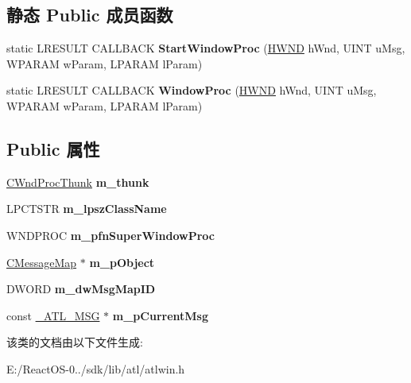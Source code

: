 \subsection*{静态 Public 成员函数}
\begin{DoxyCompactItemize}
\item 
\mbox{\label{class_a_t_l_1_1_c_contained_window_t_a52c4e15b297f166a7b29ccc0e80f5360}} 
static L\+R\+E\+S\+U\+LT C\+A\+L\+L\+B\+A\+CK {\bfseries Start\+Window\+Proc} (\hyperlink{interfacevoid}{H\+W\+ND} h\+Wnd, U\+I\+NT u\+Msg, W\+P\+A\+R\+AM w\+Param, L\+P\+A\+R\+AM l\+Param)
\item 
\mbox{\label{class_a_t_l_1_1_c_contained_window_t_a25894852e0cf8b198a15681870c714b7}} 
static L\+R\+E\+S\+U\+LT C\+A\+L\+L\+B\+A\+CK {\bfseries Window\+Proc} (\hyperlink{interfacevoid}{H\+W\+ND} h\+Wnd, U\+I\+NT u\+Msg, W\+P\+A\+R\+AM w\+Param, L\+P\+A\+R\+AM l\+Param)
\end{DoxyCompactItemize}
\subsection*{Public 属性}
\begin{DoxyCompactItemize}
\item 
\mbox{\label{class_a_t_l_1_1_c_contained_window_t_a5c8b24cc797de31d0cf675352a789fdc}} 
\hyperlink{class_a_t_l_1_1_c_wnd_proc_thunk}{C\+Wnd\+Proc\+Thunk} {\bfseries m\+\_\+thunk}
\item 
\mbox{\label{class_a_t_l_1_1_c_contained_window_t_ad44f8d98569fe3df3f3bdc32dd84b557}} 
L\+P\+C\+T\+S\+TR {\bfseries m\+\_\+lpsz\+Class\+Name}
\item 
\mbox{\label{class_a_t_l_1_1_c_contained_window_t_a4b6047d0a90e7e9c9286f4513878ab3e}} 
W\+N\+D\+P\+R\+OC {\bfseries m\+\_\+pfn\+Super\+Window\+Proc}
\item 
\mbox{\label{class_a_t_l_1_1_c_contained_window_t_a40a68e484a9b9aa588bb3f7067dbebea}} 
\hyperlink{class_a_t_l_1_1_c_message_map}{C\+Message\+Map} $\ast$ {\bfseries m\+\_\+p\+Object}
\item 
\mbox{\label{class_a_t_l_1_1_c_contained_window_t_a75a60db16e81f5c1f31727682a8bd229}} 
D\+W\+O\+RD {\bfseries m\+\_\+dw\+Msg\+Map\+ID}
\item 
\mbox{\label{class_a_t_l_1_1_c_contained_window_t_af39f58992037ced170d2bc6b06daf19e}} 
const \hyperlink{struct_a_t_l_1_1___a_t_l___m_s_g}{\+\_\+\+A\+T\+L\+\_\+\+M\+SG} $\ast$ {\bfseries m\+\_\+p\+Current\+Msg}
\end{DoxyCompactItemize}


该类的文档由以下文件生成\+:\begin{DoxyCompactItemize}
\item 
E\+:/\+React\+O\+S-\/0../sdk/lib/atl/atlwin.\+h\end{DoxyCompactItemize}
